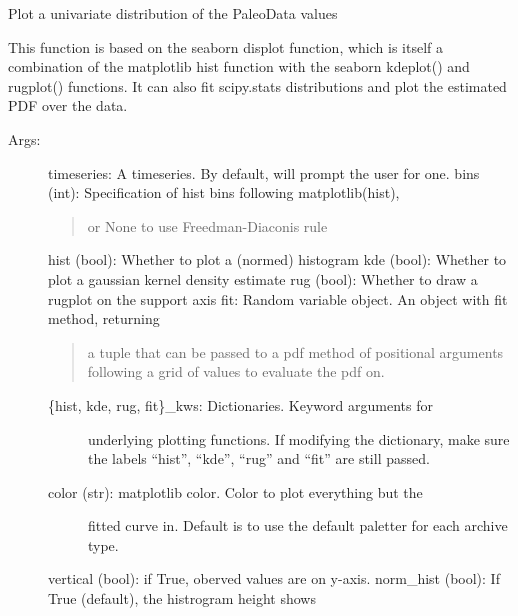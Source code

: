 \documentclass[letterpaper,10pt,english]{sphinxmanual}
\begin{document}
\begin{fulllineitems}
\label{\detokenize{Main:pyleoclim.histTs}}
Plot a univariate distribution of the PaleoData values

This function is based on the seaborn displot function, which is
itself a combination of the matplotlib hist function with the
seaborn kdeplot() and rugplot() functions. It can also fit
scipy.stats distributions and plot the estimated PDF over the data.
\begin{description}
\item[{Args:}] \leavevmode
timeseries: A timeseries. By default, will prompt the user for one.
bins (int): Specification of hist bins following matplotlib(hist),
\begin{quote}

or None to use Freedman-Diaconis rule
\end{quote}

hist (bool): Whether to plot a (normed) histogram
kde (bool): Whether to plot a gaussian kernel density estimate
rug (bool): Whether to draw a rugplot on the support axis
fit: Random variable object. An object with fit method, returning
\begin{quote}

a tuple that can be passed to a pdf method of positional
arguments following a grid of values to evaluate the pdf on.
\end{quote}
\begin{description}
\item[{\{hist, kde, rug, fit\}\_kws: Dictionaries. Keyword arguments for}] \leavevmode
underlying plotting functions. If modifying the dictionary, make
sure the labels “hist”, “kde”, “rug” and “fit” are still passed.

\item[{color (str): matplotlib color. Color to plot everything but the}] \leavevmode
fitted curve in. Default is to use the default paletter for each
archive type.

\end{description}

vertical (bool): if True, oberved values are on y-axis.
norm\_hist (bool): If True (default), the histrogram height shows
\begin{quote}


\end{quote}
\end{description}
\end{fulllineitems}
\end{document}
